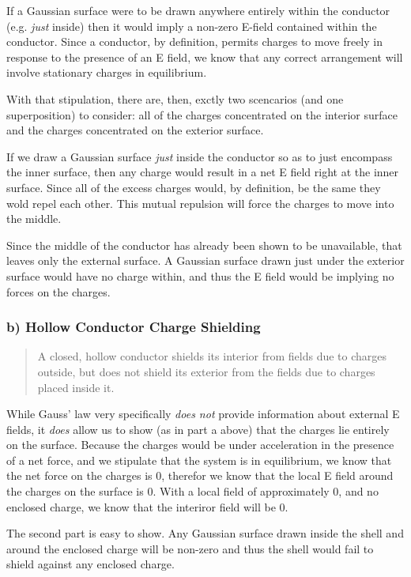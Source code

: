 If a Gaussian surface were to be drawn anywhere entirely within the
conductor (e.g. \emph{just} inside) then it would imply a non-zero
E-field contained within the conductor.  Since a conductor, by
definition, permits charges to move freely in response to the presence
of an E field, we know that any correct arrangement will involve
stationary charges in equilibrium.

With that stipulation, there are, then, exctly two scencarios (and one
superposition) to consider: all of the charges concentrated on the
interior surface and the charges concentrated on the exterior surface.

If we draw a Gaussian surface \emph{just} inside the conductor so as
to just encompass the inner surface, then any charge would result in a
net E field right at the inner surface.  Since all of the excess
charges would, by definition, be the same they wold repel each other.
This mutual repulsion will force the charges to move into the middle.

Since the middle of the conductor has already been shown to be
unavailable, that leaves only the external surface.  A Gaussian
surface drawn just under the exterior surface would have no charge
within, and thus the E field would be implying no forces on the
charges.

\subsubsection*{b) Hollow Conductor Charge Shielding}

\begin{quote}
A closed, hollow conductor shields its interior from fields due to
charges outside, but does not shield its exterior from the fields due
to charges placed inside it.
\end{quote}

While Gauss' law very specifically \emph{does not} provide information
about external E fields, it \emph{does} allow us to show (as in part a
above) that the charges lie entirely on the surface.  Because the
charges would be under acceleration in the presence of a net force,
and we stipulate that the system is in equilibrium, we know that the
net force on the charges is 0, therefor we know that the local E field
around the charges on the surface is 0.  With a local field of
approximately 0, and no enclosed charge, we know that the interiror
field will be 0.

The second part is easy to show.  Any Gaussian surface drawn inside
the shell and around the enclosed charge will be non-zero and thus the
shell would fail to shield against any enclosed charge.

